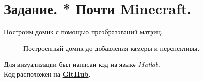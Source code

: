 \documentclass[a5paper, 10pt]{article}
\theoremstyle{definition}
\theoremstyle{plain}
\theoremstyle{remark}
\begin{document}
\newpage
\section{Задание. * Почти Minecraft.}

Построим домик с помощью преобразований матриц.
\begin{figure}[h!]
\caption{Построенный домик до добавления камеры и перспективы.}
\end{figure}





Для визуализации был написан код на языке \textit{Matlab}. \\
Код расположен на \href{https://github.com/a-nechaeva/practical_Linal/tree/main/lab3}{\textbf{GitHub}}.
\end{document}

